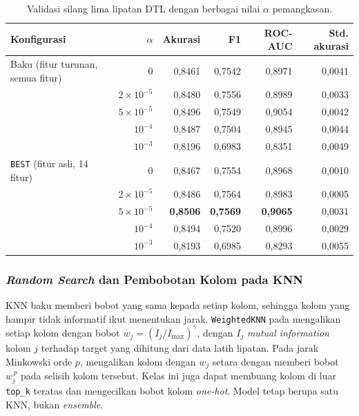 \begin{table}[htbp]
    \centering
    \small
    \begin{tabular}{@{}l r r r r r@{}}
        \toprule
        Konfigurasi & $\alpha$ & Akurasi & F1 & ROC-AUC & Std. akurasi \\
        \midrule
        Baku (fitur turunan, semua fitur) & 0 & 0,8461 & 0,7542 & 0,8971 & 0,0041 \\
         & $2\times10^{-5}$ & 0,8480 & 0,7556 & 0,8989 & 0,0033 \\
         & $5\times10^{-5}$ & 0,8496 & 0,7549 & 0,9054 & 0,0042 \\
         & $10^{-4}$ & 0,8487 & 0,7504 & 0,8945 & 0,0044 \\
         & $10^{-3}$ & 0,8196 & 0,6983 & 0,8351 & 0,0049 \\
        \midrule
        \texttt{BEST} (fitur asli, 14 fitur) & 0 & 0,8467 & 0,7554 & 0,8968 & 0,0010 \\
         & $2\times10^{-5}$ & 0,8486 & 0,7564 & 0,8983 & 0,0005 \\
         & $5\times10^{-5}$ & \textbf{0,8506} & \textbf{0,7569} & \textbf{0,9065} & 0,0031 \\
         & $10^{-4}$ & 0,8494 & 0,7520 & 0,8996 & 0,0029 \\
         & $10^{-3}$ & 0,8193 & 0,6985 & 0,8293 & 0,0055 \\
        \bottomrule
    \end{tabular}
    \caption{Validasi silang lima lipatan DTL dengan berbagai nilai $\alpha$ pemangkasan.}
    \label{tab:prune}
\end{table}

\subsubsection{\textit{Random Search} dan Pembobotan Kolom pada KNN}
KNN baku memberi bobot yang sama kepada setiap kolom, sehingga kolom yang hampir tidak informatif ikut menentukan jarak. \texttt{WeightedKNN} pada  mengalikan setiap kolom dengan bobot $w_j=(I_j/I_{\max})^{\gamma}$, dengan $I_j$ \textit{mutual information} kolom $j$ terhadap target yang dihitung dari data latih lipatan. Pada jarak Minkowski orde $p$, mengalikan kolom dengan $w_j$ setara dengan memberi bobot $w_j^{\,p}$ pada selisih kolom tersebut. Kelas ini juga dapat membuang kolom di luar \texttt{top\_k} teratas dan mengecilkan bobot kolom \textit{one-hot}. Model tetap berupa satu KNN, bukan \textit{ensemble}.

